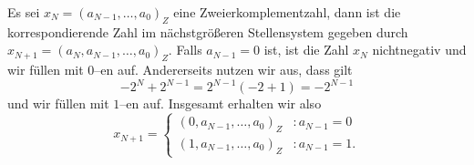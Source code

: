 Es sei $x_{N} = (a_{N-1}, \dots, a_0)_{Z}$ eine Zweierkomplementzahl, dann ist die korrespondierende Zahl im nächstgrößeren Stellensystem gegeben durch $x_{N+1} = (a_{N}, a_{N-1}, \dots, a_0)_{Z}$. Falls $a_{N-1} = 0$ ist, ist die Zahl $x_{N}$ nichtnegativ und wir füllen mit $0$--en auf. Andererseits nutzen wir aus, dass gilt
$$
	-2^{N} + 2^{N-1} = 2^{N-1}(-2 + 1) = - 2^{N-1}
$$
und wir füllen mit $1$--en auf. Insgesamt erhalten wir also
$$x_{N+1} = \begin{cases}
(0,a_{N-1}, \dots, a_0)_{Z}& : a_{N-1} = 0\\
(1, a_{N-1}, \dots, a_0)_{Z}& : a_{N-1} = 1.
\end{cases} $$
